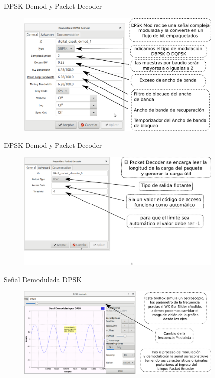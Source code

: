 \begin{frame}{DPSK Demod y Packet Decoder }
\begin{figure}[H]
	\vspace{-3mm}
	\centering
	\includegraphics[width=0.9\textwidth]{Modulaciones_digitales/lab18/pdf/04DPSK_Demod.pdf}
\end{figure}
\end{frame}

\begin{frame}{DPSK Demod y Packet Decoder}
\begin{figure}[H]
	\vspace{-3mm}
	\centering
	\includegraphics[width=0.9\textwidth]{Modulaciones_digitales/lab18/pdf/05Packet_Decoder.pdf}
\end{figure}
\end{frame}

\begin{frame}{ Señal Demodulada DPSK}
\begin{figure}[H]
	\vspace{-3mm}
	\centering
	\includegraphics[width=0.9\textwidth]{Modulaciones_digitales/lab18/pdf/06Salida.pdf}
\end{figure}
\end{frame}
		


